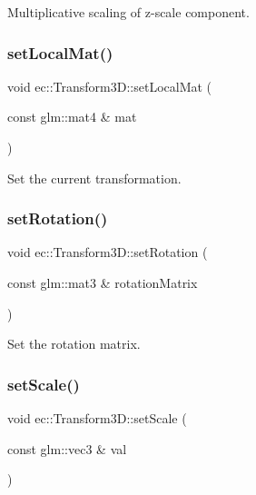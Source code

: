 Multiplicative scaling of z-\/scale component. \mbox{\label{classec_1_1_transform3_d_a5cc1409f0c09910a701dcd294e797498}} 
\subsubsection{\texorpdfstring{set\+Local\+Mat()}{setLocalMat()}}
{\footnotesize\ttfamily void ec\+::\+Transform3\+D\+::set\+Local\+Mat (\begin{DoxyParamCaption}\item[{const glm\+::mat4 \&}]{mat }\end{DoxyParamCaption})}



Set the current transformation. 

\mbox{\label{classec_1_1_transform3_d_adc80d3f045c44c02bec2f2c1db2144db}} 
\subsubsection{\texorpdfstring{set\+Rotation()}{setRotation()}}
{\footnotesize\ttfamily void ec\+::\+Transform3\+D\+::set\+Rotation (\begin{DoxyParamCaption}\item[{const glm\+::mat3 \&}]{rotation\+Matrix }\end{DoxyParamCaption})}

Set the rotation matrix. \mbox{\label{classec_1_1_transform3_d_af8c2d1832acc0b0b52e217de4efa4d91}} 
\subsubsection{\texorpdfstring{set\+Scale()}{setScale()}\hspace{0.1cm}{\footnotesize\ttfamily [1/3]}}
{\footnotesize\ttfamily void ec\+::\+Transform3\+D\+::set\+Scale (\begin{DoxyParamCaption}\item[{const glm\+::vec3 \&}]{val }\end{DoxyParamCaption})}

